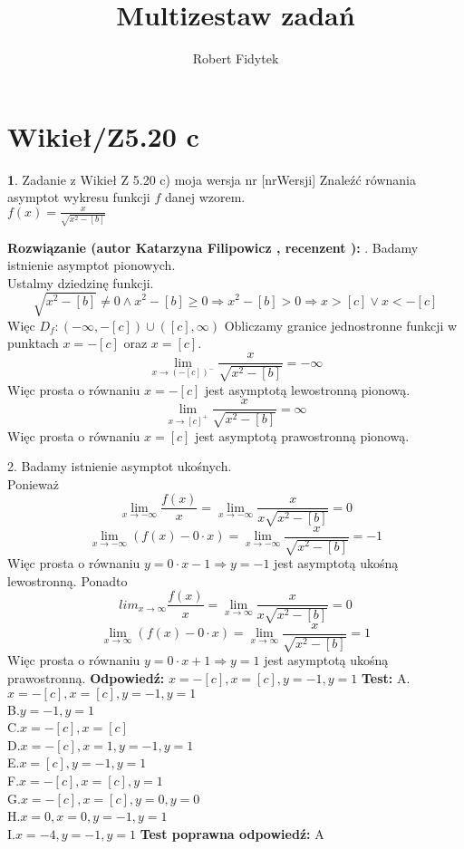 \documentclass[12pt, a4paper]{article}
\title{Multizestaw zadań}
\author{Robert Fidytek}
\date{}
\theoremstyle{definition} %
\newtheorem{zad}{}
\newcommand{\kategoria}[1]{\section{#1}} %
\newcommand{\zadStart}[1]{\begin{zad}#1\newline} %
\newcommand{\zadStop}{\end{zad}}   %
\newcommand{\rozwStart}[2]{\noindent \textbf{Rozwiązanie (autor #1 , recenzent #2): }\newline} %
\newcommand{\rozwStop}{\newline}                                            %
\newcommand{\odpStart}{\noindent \textbf{Odpowiedź:}\newline}    %
\newcommand{\odpStop}{\newline}                                             %
\newcommand{\testStart}{\noindent \textbf{Test:}\newline} %
\newcommand{\testStop}{\newline} %
\newcommand{\kluczStart}{\noindent \textbf{Test poprawna odpowiedź:}\newline} %
\newcommand{\kluczStop}{\newline} %
\begin{document}
\maketitle


\kategoria{Wikieł/Z5.20 c}
\zadStart{Zadanie z Wikieł Z 5.20 c) moja wersja nr [nrWersji]}
Znaleźć równania asymptot wykresu funkcji $f$ danej wzorem.\\
 $f(x)=\frac{x}{\sqrt{x^2-[b]}}$
\zadStop
\rozwStart{Katarzyna Filipowicz}{}
1. Badamy istnienie asymptot pionowych.\\
Ustalmy dziedzinę funkcji.\\
$$
\sqrt{x^2-[b]}\neq0 \wedge x^2-[b]\geq 0\Rightarrow  x^2-[b]>0 \Rightarrow x>[c] \vee  x<-[c]
$$
Więc $D_f:(-\infty,-[c]) \cup ([c],\infty)$
Obliczamy granice jednostronne funkcji w punktach $x=-[c]$ oraz $x=[c]$.
$$
\lim_{x\rightarrow (-[c])^{-}}\frac{x}{\sqrt{x^2-[b]}}=-\infty
$$
Więc prosta o równaniu $x=-[c]$ jest asymptotą lewostronną pionową.
$$
\lim_{x\rightarrow [c]^{+}}\frac{x}{\sqrt{x^2-[b]}}=\infty
$$
Więc prosta o równaniu $x=[c]$ jest asymptotą prawostronną pionową.


2. Badamy istnienie asymptot ukośnych.\\
Ponieważ
$$ 
\lim_{x\rightarrow-\infty} \frac{f(x)}{x}
=\lim_{x\rightarrow-\infty}\frac{x}{x\sqrt{x^2-[b]}}
=0
$$ $$
\lim_{x\rightarrow-\infty}(f(x)-0\cdot x)
=\lim_{x\rightarrow-\infty}\frac{x}{\sqrt{x^2-[b]}}
=-1
$$
Więc prosta o równaniu $y=0\cdot x-1 \Rightarrow y=-1$ jest asymptotą ukośną lewostronną.
Ponadto
$$ 
lim_{x\rightarrow\infty} \frac{f(x)}{x}
=\lim_{x\rightarrow\infty}\frac{x}{x\sqrt{x^2-[b]}}
=0
$$ $$
\lim_{x\rightarrow\infty}(f(x)-0\cdot x)
=\lim_{x\rightarrow\infty}\frac{x}{\sqrt{x^2-[b]}}
=1
$$
Więc prosta o równaniu $y=0\cdot x+1 \Rightarrow y=1$ jest asymptotą ukośną prawostronną.
\rozwStop
\odpStart
$x=-[c],x=[c],y=-1,y=1$
\odpStop
\testStart
A.$x=-[c],x=[c],y=-1,y=1$\\
B.$y=-1,y=1$\\
C.$x=-[c],x=[c]$\\
D.$x=-[c],x=1,y=-1,y=1$\\
E.$x=[c],y=-1,y=1$\\
F.$x=-[c],x=[c],y=1$\\
G.$x=-[c],x=[c],y=0,y=0$\\
H.$x=0,x=0,y=-1,y=1$\\
I.$x=-4,y=-1,y=1$
\testStop
\kluczStart
A
\kluczStop
\end{document}
